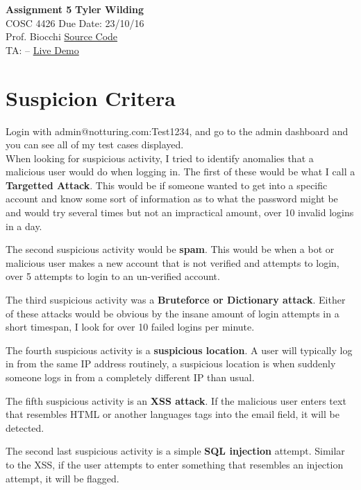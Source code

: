 \documentclass[a4paper, 11pt]{article}
\begin{document}
\noindent
\large\textbf{Assignment 5} \hfill \textbf{Tyler Wilding} \\
\normalsize COSC 4426 \hfill Due Date: 23/10/16 \\
Prof. Biocchi \hfill \href{https://github.com/xTVaser/Schoolwork-Fall-2016/tree/master/Internet%20Security/encryption-webapp}{Source Code} \\
TA: -- \hfill \href{https://notturing.ddns.net/tyler/IS_ASS5/form.php}{Live Demo}

\section*{Suspicion Critera}
Login with admin@notturing.com:Test1234, and go to the admin dashboard and you can see all of my test cases displayed. \\

When looking for suspicious activity, I tried to identify anomalies that a malicious user would do when logging in.  The first of these would be what I call a \textbf{Targetted Attack}.  This would be if someone wanted to get into a specific account and know some sort of information as to what the password might be and would try several times but not an impractical amount, over 10 invalid logins in a day.

The second suspicious activity would be \textbf{spam}.  This would be when a bot or malicious user makes a new account that is not verified and attempts to login, over 5 attempts to login to an un-verified account.

The third suspicious activity was a \textbf{Bruteforce or Dictionary attack}.  Either of these attacks would be obvious by the insane amount of login attempts in a short timespan, I look for over 10 failed logins per minute.

The fourth suspicious activity is a \textbf{suspicious location}.  A user will typically log in from the same IP address routinely, a suspicious location is when suddenly someone logs in from a completely different IP than usual.

The fifth suspicious activity is an \textbf{XSS attack}.  If the malicious user enters text that resembles HTML or another languages tags into the email field, it will be detected.

The second last suspicious activity is a simple \textbf{SQL injection} attempt.  Similar to the XSS, if the user attempts to enter something that resembles an injection attempt, it will be flagged.
\end{document}
